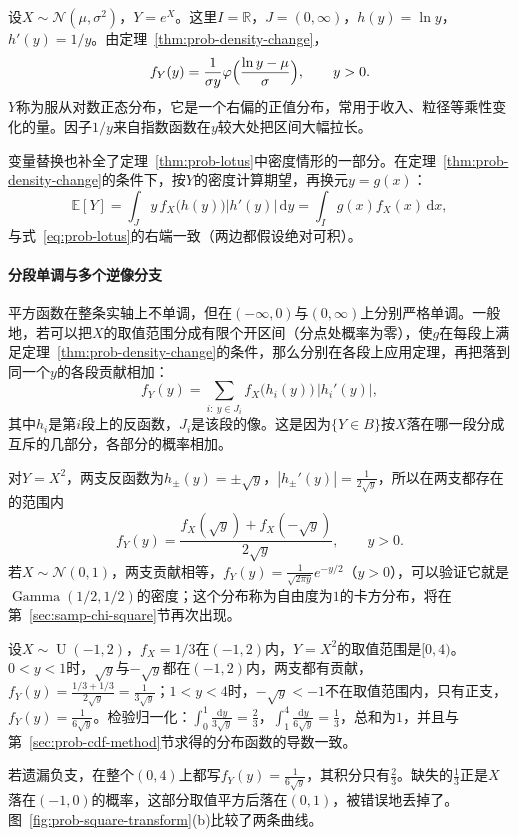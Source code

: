\begin{example}[对数正态分布]
\label{ex:prob-lognormal}
设$X\sim\mathcal{N}(\mu,\sigma^2)$，$Y=e^X$。这里$I=\mathbb{R}$，$J=(0,\infty)$，$h(y)=\ln y$，$h'(y)=1/y$。由定理~\ref{thm:prob-density-change}，
\[
  f_Y(y)=\frac{1}{\sigma y}\varphi\Bigl(\frac{\ln y-\mu}{\sigma}\Bigr),\qquad y>0 .
\]
$Y$称为服从对数正态分布，它是一个右偏的正值分布，常用于收入、粒径等乘性变化的量。因子$1/y$来自指数函数在$y$较大处把区间大幅拉长。
\end{example}

变量替换也补全了定理~\ref{thm:prob-lotus}中密度情形的一部分。在定理~\ref{thm:prob-density-change}的条件下，按$Y$的密度计算期望，再换元$y=g(x)$：
\[
  \mathbb{E}[Y]=\int_Jy\,f_X\bigl(h(y)\bigr)|h'(y)|\,\mathrm{d}y=\int_Ig(x)f_X(x)\,\mathrm{d}x,
\]
与式~\eqref{eq:prob-lotus}的右端一致（两边都假设绝对可积）。

\paragraph{分段单调与多个逆像分支}
平方函数在整条实轴上不单调，但在$(-\infty,0)$与$(0,\infty)$上分别严格单调。一般地，若可以把$X$的取值范围分成有限个开区间（分点处概率为零），使$g$在每段上满足定理~\ref{thm:prob-density-change}的条件，那么分别在各段上应用定理，再把落到同一个$y$的各段贡献相加：
\[
  f_Y(y)=\sum_{i:\ y\in J_i}f_X\bigl(h_i(y)\bigr)\,\bigl|h_i'(y)\bigr|,
\]
其中$h_i$是第$i$段上的反函数，$J_i$是该段的像。这是因为$\{Y\in B\}$按$X$落在哪一段分成互斥的几部分，各部分的概率相加。

对$Y=X^2$，两支反函数为$h_\pm(y)=\pm\sqrt y$，$|h_\pm'(y)|=\frac{1}{2\sqrt y}$，所以在两支都存在的范围内
\[
  f_Y(y)=\frac{f_X(\sqrt y)+f_X(-\sqrt y)}{2\sqrt y},\qquad y>0 .
\]
若$X\sim\mathcal{N}(0,1)$，两支贡献相等，$f_Y(y)=\frac{1}{\sqrt{2\pi y}}e^{-y/2}$（$y>0$），可以验证它就是$\operatorname{Gamma}(1/2,1/2)$的密度；这个分布称为自由度为$1$的卡方分布，将在第~\ref{sec:samp-chi-square}节再次出现。

\begin{example}[平方变换中的分支]
\label{ex:prob-square-branches}
设$X\sim\operatorname{U}(-1,2)$，$f_X=1/3$在$(-1,2)$内，$Y=X^2$的取值范围是$[0,4)$。$0<y<1$时，$\sqrt y$与$-\sqrt y$都在$(-1,2)$内，两支都有贡献，$f_Y(y)=\frac{1/3+1/3}{2\sqrt y}=\frac{1}{3\sqrt y}$；$1<y<4$时，$-\sqrt y<-1$不在取值范围内，只有正支，$f_Y(y)=\frac{1}{6\sqrt y}$。检验归一化：$\int_0^1\frac{\mathrm{d}y}{3\sqrt y}=\frac23$，$\int_1^4\frac{\mathrm{d}y}{6\sqrt y}=\frac13$，总和为$1$，并且与第~\ref{sec:prob-cdf-method}节求得的分布函数的导数一致。

若遗漏负支，在整个$(0,4)$上都写$f_Y(y)=\frac{1}{6\sqrt y}$，其积分只有$\frac23$。缺失的$\frac13$正是$X$落在$(-1,0)$的概率，这部分取值平方后落在$(0,1)$，被错误地丢掉了。图~\ref{fig:prob-square-transform}(b)比较了两条曲线。
\end{example}

